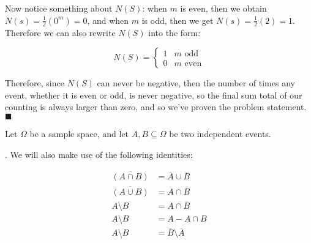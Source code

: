 \documentclass[11pt]{article}
\begin{document}
\begin{solution}
    Now notice something about $N(S)$: when $m$ is even, then we obtain $N(s) = \frac 12 (0^m) = 0$, and when $m$ is odd, then we get $N(s) = \frac 12 (2) = 1$. Therefore we can also rewrite $N(S)$ into the form: 

    \[ N(S) = \begin{cases}
        1 & \text{$m$ odd}\\
        0 & \text{$m$ even}
    \end{cases}\] 

    Therefore, since $N(S)$ can never be negative, then the number of times any event, whether it is even or odd, is never negative, so the final sum total of our counting is always larger than zero, and so we've proven the problem statement. $\blacksquare$
\end{solution}

\pagebreak
{}

Let $\Omega$ be a sample space, and let $A,B \subseteq \Omega$ be two independent events.

{\color{blue}{Because $A$ and $B$ are independent events, then $\Pr[A \cap B] = \Pr[A] \Pr[B]$}. We will also make use of the following identities: 

\begin{align*}
    \overline{(A \cap B)} &= \overline A \cup \overline B\\
    \overline{(A \cup B)} &= \overline A \cap \overline B\\
    A \setminus B &= A \cap \overline B\\
    A \setminus B &= A - A \cap B\\
    A \setminus B &= \overline B \setminus \overline A
\end{align*}
}
\end{document}
